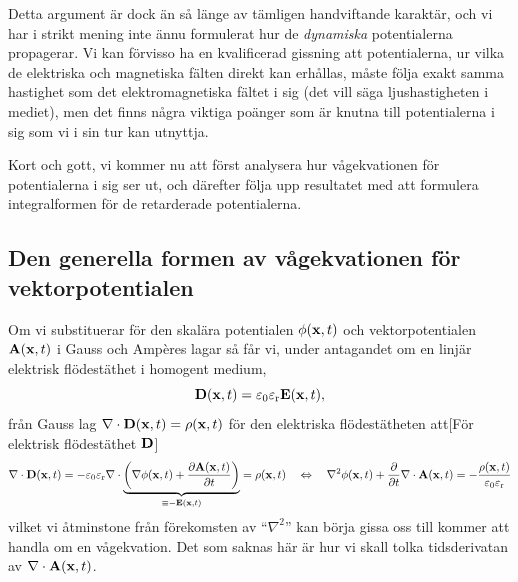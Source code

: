 Detta argument {\"a}r dock {\"a}n s{\aa} l{\"a}nge av t{\"a}mligen handviftande
karakt{\"a}r, och vi har i strikt mening inte {\"a}nnu formulerat hur de
{\it dynamiska} potentialerna propagerar. Vi kan f{\"o}rvisso ha en kvalificerad
gissning att potentialerna, ur vilka de elektriska och magnetiska f{\"a}lten
direkt kan erh{\aa}llas, m{\aa}ste f{\"o}lja exakt samma hastighet som det
elektromagnetiska f{\"a}ltet i sig (det vill s{\"a}ga ljushastigheten i mediet),
men det finns n{\aa}gra viktiga po{\"a}nger som {\"a}r knutna till potentialerna
i sig som vi i sin tur kan utnyttja.

Kort och gott, vi kommer nu att f{\"o}rst analysera hur v{\aa}gekvationen
f{\"o}r potentialerna i sig ser ut, och d{\"a}refter f{\"o}lja upp resultatet
med att formulera integralformen f{\"o}r de retarderade
potentialerna.
\vfill\eject

\subsection{Den generella formen av v{\aa}gekvationen f{\"o}r vektorpotentialen}
Om vi substituerar f{\"o}r den skal{\"a}ra potentialen $\phi({\bf x},t)$ och
vektorpotentialen ${\bf A}({\bf x},t)$ i Gauss och Amp{\`e}res
lagar
s{\aa} f{\aa}r vi, under antagandet om en linj{\"a}r elektrisk
fl{\"o}dest{\"a}thet i homogent medium,
$$
  {\bf D}({\bf x},t)=\varepsilon_0\varepsilon_{\rm r}{\bf E}({\bf x},t),
$$
fr{\aa}n Gauss lag $\nabla\cdot{\bf D}({\bf x},t)=\rho({\bf x},t)$ f{\"o}r den
elektriska fl{\"o}dest{\"a}theten att[F{\"o}r elektrisk
fl{\"o}dest{\"a}thet ${\bf D}$]
$$
  \nabla\cdot{\bf D}({\bf x},t)
    =-\varepsilon_0\varepsilon_{\rm r}\nabla\cdot
      \underbrace{
        \bigg(
          \nabla\phi({\bf x},t)+{{\partial{\bf A}({\bf x},t)}\over{\partial t}}
        \bigg)
      }_{\equiv-{\bf E}({\bf x},t)}
    =\rho({\bf x},t)
  \quad\Leftrightarrow\quad
    \nabla^2\phi({\bf x},t)
      +{{\partial}\over{\partial t}}\nabla\cdot{\bf A}({\bf x},t)
    =-{{\rho({\bf x},t)}\over{\varepsilon_0\varepsilon_{\rm r}}}
$$
vilket vi {\aa}tminstone fr{\aa}n f{\"o}rekomsten av ``$\nabla^2$'' kan
b{\"o}rja gissa oss till kommer att handla om en v{\aa}gekvation.
Det som saknas h{\"a}r {\"a}r hur vi skall tolka tidsderivatan av
$\nabla\cdot{\bf A}({\bf x},t)$.

